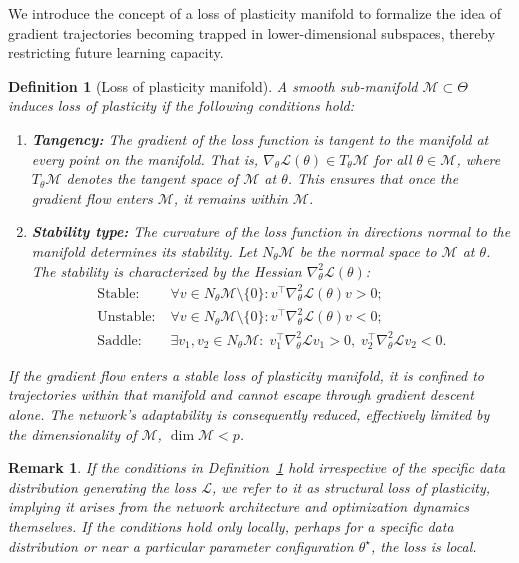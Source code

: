 \documentclass{article}
\newcommand{\Loss}{\mathcal{L}}
\newtheorem{definition}{Definition}[section]
\newtheorem{remark}{Remark}[section]
\begin{document}
We introduce the concept of a loss of plasticity manifold to formalize the idea of gradient trajectories becoming trapped in lower-dimensional subspaces, thereby restricting future learning capacity.

\begin{definition}[Loss of plasticity manifold]
\label{def:lop}
A smooth sub-manifold $\mathcal{M}\subset\Theta$ induces loss of plasticity if the following conditions hold:
\begin{enumerate}[label=(\alph*)]
    \item \textbf{Tangency:} The gradient of the loss function is tangent to the manifold at every point on the manifold. That is, $\nabla_\theta\Loss(\theta)\in T_\theta\mathcal{M}$ for all $\theta\in\mathcal{M}$, where $T_\theta\mathcal{M}$ denotes the tangent space of $\mathcal{M}$ at $\theta$. This ensures that once the gradient flow enters $\mathcal{M}$, it remains within $\mathcal{M}$.
    \item \textbf{Stability type:} The curvature of the loss function in directions normal to the manifold determines its stability. Let $N_\theta\mathcal{M}$ be the normal space to $\mathcal{M}$ at $\theta$. The stability is characterized by the Hessian $\nabla_\theta^2\Loss(\theta)$: \vspace{-4pt}
        \begin{align}
        \text{Stable:}\; &\forall v\in N_\theta\mathcal{M}\setminus\{0\}: v^\top\nabla_\theta^2\Loss(\theta)v > 0; \label{eq:stable}\\
        \text{Unstable:}\; &\forall v\in N_\theta\mathcal{M}\setminus\{0\}: v^\top\nabla_\theta^2\Loss(\theta)v < 0; \label{eq:unstable}\\
        \text{Saddle:}\; &\exists v_1,v_2\in N_\theta\mathcal{M}:\; v_1^\top\nabla_\theta^2\Loss v_1>0,\; v_2^\top\nabla_\theta^2\Loss v_2<0. \label{eq:saddle}
        \end{align}
\end{enumerate}
If the gradient flow enters a \emph{stable} loss of plasticity manifold, it is confined to trajectories within that manifold and cannot escape through gradient descent alone. The network's adaptability is consequently reduced, effectively limited by the dimensionality of $\mathcal{M}$, $\dim\mathcal{M} < p$.
\end{definition}

\begin{remark}
If the conditions in Definition~\ref{def:lop} hold irrespective of the specific data distribution generating the loss $\Loss$, we refer to it as structural loss of plasticity, implying it arises from the network architecture and optimization dynamics themselves. If the conditions hold only locally, perhaps for a specific data distribution or near a particular parameter configuration $\theta^\star$, the loss is local.
\end{remark}
\end{document}
